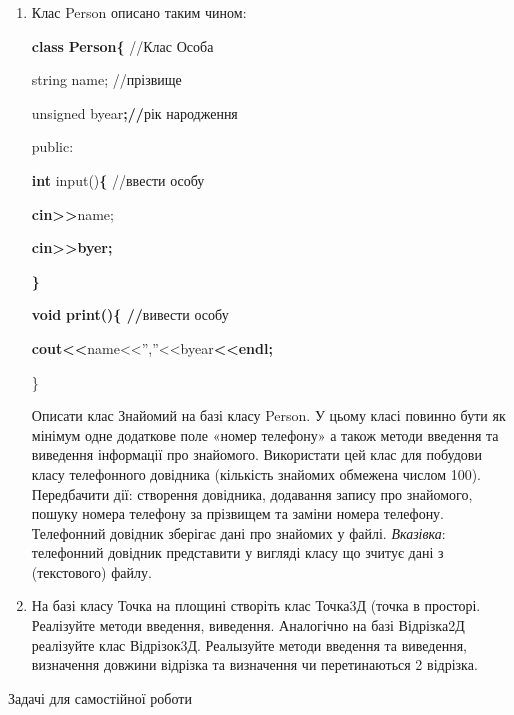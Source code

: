 \documentclass[]{article}
\begin{document}
\begin{enumerate}
\def\labelenumi{\arabic{enumi})}

\item
Клас Person описано таким чином:

\textbf{class} \textbf{Person\{} //Клас Особа

string name; //прізвище

unsigned byear\textbf{;//}рік народження

public:

\textbf{int} input()\textbf{\{} //ввести особу

\textbf{cin\textgreater{}\textgreater{}}name;

\textbf{cin\textgreater{}\textgreater{}byer;}

\textbf{\}}

\textbf{void} \textbf{print()\{ //}вивести особу

\textbf{cout\textless{}\textless{}}name\textless{}\textless{}'',''\textless{}\textless{}byear\textbf{\textless{}\textless{}endl;}

\}

  Описати клас Знайомий на базі класу Person. У цьому класі повинно бути 
як мінімум одне додаткове поле «номер
телефону» а також методи введення та виведення інформації про знайомого. 
Використати цей клас для побудови класу телефонного довідника (кількість
знайомих обмежена числом 100). Передбачити дії: створення довідника, додавання запису про знайомого,
пошуку номера телефону за прізвищем та заміни номера телефону. 
Телефонний довідник зберігає дані про знайомих у файлі.
\emph{\emph{Вказівка}}: телефонний довідник представити у вигляді класу
що зчитує дані з (текстового) файлу.

\item
  На базі класу Точка на площині створіть клас Точка3Д (точка
  в просторі. Реалізуйте методи введення, виведення. Аналогічно на базі
  Відрізка2Д реалізуйте клас Відрізок3Д. Реалызуйте методи
  введення та виведення, визначення довжини відрізка та
  визначення чи перетинаються 2 відрізка.

\end{enumerate}

Задачі для самостійної роботи
\end{document}
